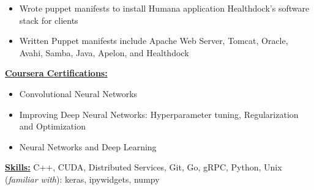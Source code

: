 \documentclass[11pt]{ltxdoc}
\begin{document}
		\begin{itemize}
			\item Wrote puppet manifests to install Humana application Healthdock's software stack for clients
			\item Written Puppet manifests include Apache Web Server, Tomcat, Oracle, Avahi, Samba, Java, Apelon, and Healthdock
		\end{itemize}
		
	\textbf{\underline{Coursera Certifications:}}
		\begin{itemize}
		  \item Convolutional Neural Networks
		  \item Improving Deep Neural Networks: Hyperparameter tuning, Regularization and Optimization
		  \item Neural Networks and Deep Learning
		\end{itemize}
	
\textbf{\underline{Skills:}} C++, CUDA, Distributed Services, Git, Go, gRPC, Python, Unix \\
(\emph{familiar with}): keras, ipywidgets, numpy
\end{document}

